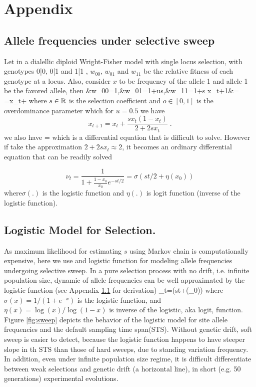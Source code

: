 \documentclass[11pt]{article}
\begin{document}
\section{Appendix}
\subsection{Allele frequencies under selective sweep} \label{app:af}
Let in a dialellic diploid Wright-Fisher model with single locus selection, 
with genotypes 0|0, 0|1 and 1|1 , $w_{00}$, $w_{01}$ and  $w_{11}$ be the 
relative fitness of each genotype at a locus. Also, consider $x$ to be 
frequency of the allele 1 and allele 1 be the favored allele, then
\beq
&w_{00}=1,&w_{01}=1+us,&w_{11}=1+s
\eeq
\beq
x_{t+1}&= =x_t+ 
\eeq
where $s\in {\mathbb R}$ is the selection coefficient and $o\in[0,1]$ is the 
overdominance parameter which for $u=0.5$ we have
\begin{equation}
x_{t+1}=x_t+\frac{sx_t(1-x_t)}{2+2sx_t}\;.
\label{eq:transition}
\end{equation}
we also have
\beq
{} = 
\eeq
which is a differential equation that is difficult to solve. However if take 
the approximation $2+2sx_t \approx 2$, it becomes an ordinary differential 
equation that can be readily solved

\begin{equation}
\nu_t =\frac{1}{1+\frac{1-x_0}{x_0}e^{-st/2}} = \sigma(st/2+\eta(x_0)) 
\label{eq:inf-pop}
\end{equation}
where$\sigma(.)$ is the logistic
function and $\eta(.)$ is logit function (inverse of the logistic function). 

\subsection{Logistic Model for Selection.}
As maximum likelihood for estimating $s$ using Markov chain is computationally 
expensive, here we use and logistic function for modeling allele frequencies 
undergoing selective sweep.
In a pure selection process with no drift, i.e. infinite 
population size, 
dynamic of allele frequencies 
can be well approximated by the logistic function (see 
Appendix \ref{app:af} 
for 
derivation)
\beq
\nu_t=\sigma(st+\eta(\nu_0))\label{eq:nut}
\eeq
where $\sigma(x)=1/(1+e^{-x})$ is the logistic function, and 
$\eta(x)=\log(x)/\log(1-x)$ is inverse of the 
logistic, aka logit, function. Figure \ref{fig:sweep} depicts 
the behavior of 
the logistic model for site allele frequencies and the 
default sampling time 
span(STS). Without genetic drift, soft sweep is easier to 
detect, 
because the logistic function happens to have steeper slope 
in th STS than 
those of hard sweeps, due to standing variation frequency. In addition, even 
under infinite 
population size regime, it is 
difficult differentiate between weak selections and genetic 
drift (a horizontal 
line), in short (e.g. 50 generations) experimental evolutions.
\end{document}
